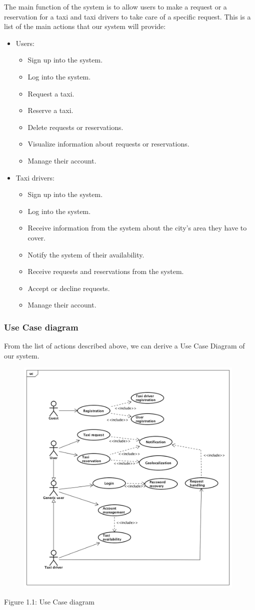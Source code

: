 The main function of the system is to allow users to make a request or a reservation for a taxi and taxi drivers to take care of a specific request.
This is a list of the main actions that our system will provide:

\begin{itemize}
    \item Users:
        \begin{itemize}
        	\item Sign up into the system.
        	\item Log into the system.
        	\item Request a taxi.
        	\item Reserve a taxi.
        	\item Delete requests or reservations.
        	\item Visualize information about requests or reservations.
        	\item Manage their account.
        \end{itemize}
    \item Taxi drivers:
        \begin{itemize}
        	\item Sign up into the system.
        	\item Log into the system.
        	\item Receive information from the system about the city's area they have to cover.
        	\item Notify the system of their availability.
        	\item Receive requests and reservations from the system.
        	\item Accept or decline requests.
        	\item Manage their account.
        \end{itemize}
\end{itemize}

\newpage
\subsubsection{Use Case diagram}
From the list of actions described above, we can derive a Use Case Diagram of our system.

\begin{figure}[h]
    \includegraphics[width=11cm]{./Diagrams/UseCaseDiagram.png}
    \centering
\end{figure}
Figure 1.1: Use Case diagram
